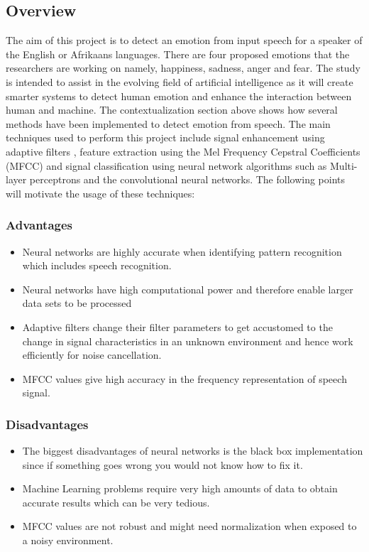 \documentclass[10pt,twocolumn]{witseiepaper}
\begin{document}
\subsection{Overview}
The aim of this project is to detect an emotion from input speech for a speaker of the English or Afrikaans languages. There are four proposed emotions that the researchers are working on namely, happiness, sadness, anger and fear. The study is intended to assist in the evolving field of artificial intelligence as it will create smarter systems to detect human emotion and enhance the interaction between human and machine. The contextualization section above shows how several methods have been implemented to detect emotion from speech. The main techniques used to perform this project include  signal enhancement using adaptive filters , feature extraction using the Mel Frequency Cepstral Coefficients (MFCC) and signal classification using neural network algorithms such as Multi-layer perceptrons  and the convolutional neural networks. The following points will motivate the usage of these techniques:
\subsubsection{Advantages}
\begin{itemize}
	\item Neural networks are highly accurate when identifying pattern recognition which includes speech recognition. 
	\item Neural networks have high computational power and therefore enable larger data sets to be processed 
	\item Adaptive filters change their filter parameters  to get accustomed to the change in signal characteristics in an unknown environment and hence work efficiently for noise cancellation.
	\item MFCC values give high accuracy in the frequency representation of speech signal.
\end{itemize}

\subsubsection{Disadvantages}
\begin{itemize}
	\item The biggest disadvantages of neural networks is the black box implementation since if something goes wrong you would not know how to fix it.
	\item  Machine Learning problems require very high amounts of data to obtain accurate results which can be very tedious.
	\item MFCC values are not robust and might need normalization when exposed to a noisy environment.
\end{itemize}
\end{document}
